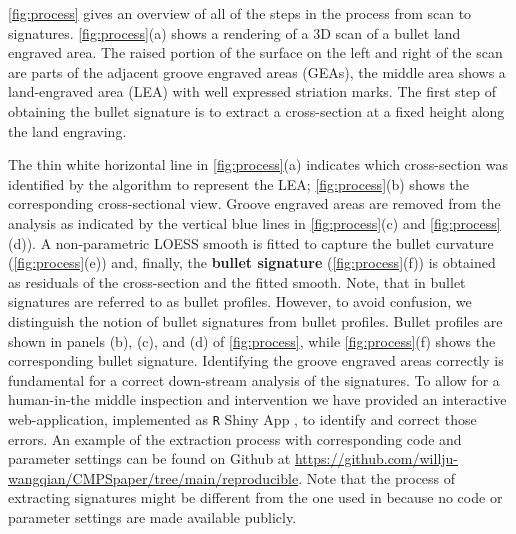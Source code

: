 \autoref{fig:process} gives an overview of all of the steps in the
process from scan to signatures. \autoref{fig:process}(a) shows a
rendering of a 3D scan of a bullet land engraved area. The raised
portion of the surface on the left and right of the scan are parts of
the adjacent groove engraved areas (GEAs), the middle area shows a
land-engraved area (LEA) with well expressed striation marks. The first
step of obtaining the bullet signature is to extract a cross-section at
a fixed height along the land engraving.

The thin white horizontal line in \autoref{fig:process}(a) indicates
which cross-section was identified by the algorithm to represent the
LEA; \autoref{fig:process}(b) shows the corresponding cross-sectional
view. Groove engraved areas are removed from the analysis as indicated
by the vertical blue lines in \autoref{fig:process}(c) and
\autoref{fig:process}(d)). A non-parametric LOESS smooth \citep{loess}
is fitted to capture the bullet curvature (\autoref{fig:process}(e))
and, finally, the \textbf{bullet signature} (\autoref{fig:process}(f))
is obtained as residuals of the cross-section and the fitted smooth.
Note, that in \citet{cmps} bullet signatures are referred to as bullet
profiles. However, to avoid confusion, we distinguish the notion of
bullet signatures from bullet profiles. Bullet profiles are shown in
panels (b), (c), and (d) of \autoref{fig:process}, while
\autoref{fig:process}(f) shows the corresponding bullet signature.
Identifying the groove engraved areas correctly is fundamental for a
correct down-stream analysis of the signatures. To allow for a
human-in-the middle inspection and intervention we have provided an
interactive web-application, implemented as \texttt{R} Shiny App
\citep{shiny},  to identify and correct those
errors. An example of the extraction process with corresponding code and
parameter settings can be found on Github at
\url{https://github.com/willju-wangqian/CMPSpaper/tree/main/reproducible}.
Note that the process of extracting signatures might be different from
the one used in \citet{cmps} because no code or parameter settings are
made available publicly.


